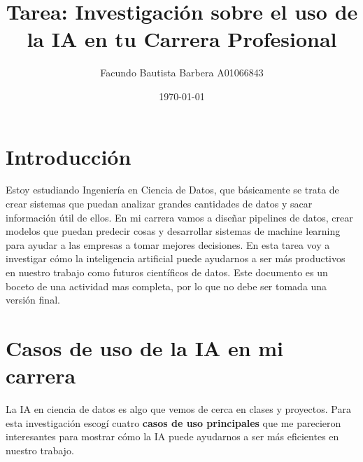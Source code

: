 \documentclass[11pt]{article}
\begin{document}
    \title{
        Tarea: Investigaci\'on sobre el uso de la IA en tu Carrera Profesional
    }
    \author{
        Facundo Bautista Barbera A01066843
    }
    \date{\today}
    \maketitle

    \section*{Introducci\'on}

    Estoy estudiando Ingenier\'ia en Ciencia de Datos, que b\'asicamente se trata de crear sistemas que puedan analizar grandes cantidades de datos y sacar informaci\'on \'util de ellos. En mi carrera vamos a dise\~nar pipelines de datos, crear modelos que puedan predecir cosas y desarrollar sistemas de machine learning para ayudar a las empresas a tomar mejores decisiones. En esta tarea voy a investigar c\'omo la inteligencia artificial puede ayudarnos a ser m\'as productivos en nuestro trabajo como futuros cient\'ificos de datos.
    Este documento es un boceto de una actividad mas completa, por lo que no debe ser tomada una versión final.

    \section*{Casos de uso de la IA en mi carrera}

    La IA en ciencia de datos es algo que vemos de cerca en clases y proyectos. Para esta investigaci\'on escog\'i cuatro \textbf{casos de uso principales} que me parecieron interesantes para mostrar c\'omo la IA puede ayudarnos a ser m\'as eficientes en nuestro trabajo.
\end{document}
